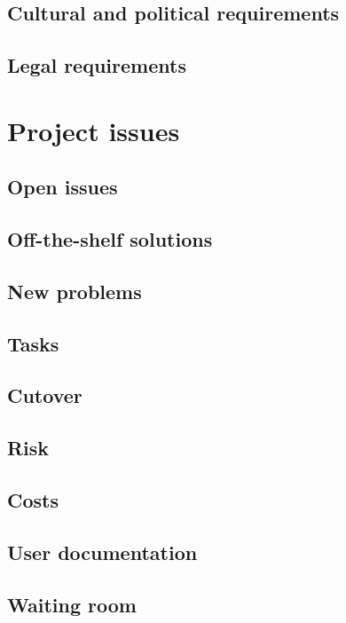 \documentclass{scrreprt}
\begin{document}
\section{Cultural and political requirements}

\section{Legal requirements}


\chapter{Project issues}
\section{Open issues}
\section{Off-the-shelf solutions}
\section{New problems}
\section{Tasks}
\section{Cutover}
\section{Risk}
\section{Costs}
\section{User documentation}
\section{Waiting room}
\end{document}
